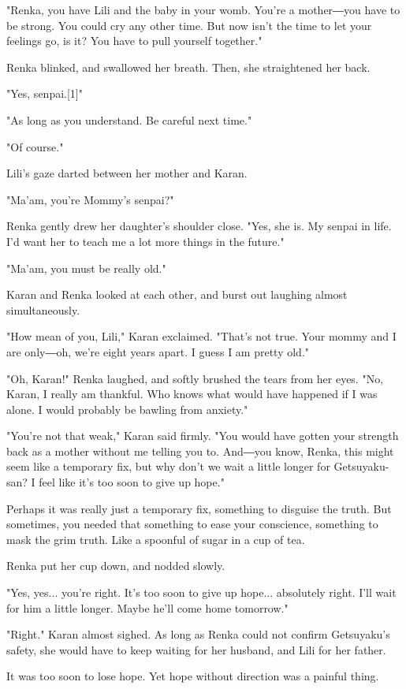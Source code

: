 "Renka, you have Lili and the baby in your womb. You're a mother―you
have to be strong. You could cry any other time. But now isn't the time
to let your feelings go, is it? You have to pull yourself together."

Renka blinked, and swallowed her breath. Then, she straightened her
back.

"Yes, senpai.{[}1{]}"

"As long as you understand. Be careful next time."

"Of course."

Lili's gaze darted between her mother and Karan.

"Ma'am, you're Mommy's senpai?"

Renka gently drew her daughter's shoulder close. "Yes, she is. My senpai
in life. I'd want her to teach me a lot more things in the future."

"Ma'am, you must be really old."

Karan and Renka looked at each other, and burst out laughing almost
simultaneously.

"How mean of you, Lili," Karan exclaimed. "That's not true. Your mommy
and I are only―oh, we're eight years apart. I guess I am pretty old."

"Oh, Karan!" Renka laughed, and softly brushed the tears from her eyes.
"No, Karan, I really am thankful. Who knows what would have happened if
I was alone. I would probably be bawling from anxiety."

"You're not that weak," Karan said firmly. "You would have gotten your
strength back as a mother without me telling you to. And―you know,
Renka, this might seem like a temporary fix, but why don't we wait a
little longer for Getsuyaku-san? I feel like it's too soon to give up
hope."

Perhaps it was really just a temporary fix, something to disguise the
truth. But sometimes, you needed that something to ease your conscience,
something to mask the grim truth. Like a spoonful of sugar in a cup of
tea.

Renka put her cup down, and nodded slowly.

"Yes, yes... you're right. It's too soon to give up hope... absolutely
right. I'll wait for him a little longer. Maybe he'll come home
tomorrow."

"Right." Karan almost sighed. As long as Renka could not confirm
Getsuyaku's safety, she would have to keep waiting for her husband, and
Lili for her father.

It was too soon to lose hope. Yet hope without direction was a painful
thing.


